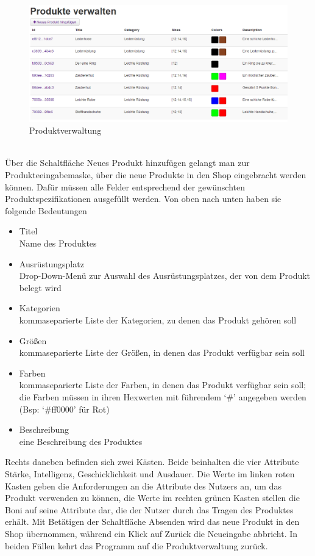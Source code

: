 \begin{figure}[h!]
  \centering
  \includegraphics[width=\textwidth]{img/Produkte.png}
  \caption{Produktverwaltung}
  \label{fig:Produktverwaltung}
\end{figure}
\text{}\vspace*{-1em}\\
Über die Schaltfläche Neues Produkt hinzufügen gelangt man zur Produkteeingabemaske, über die neue Produkte in den Shop eingebracht werden können. Dafür müssen alle Felder entsprechend der gewünschten Produktspezifikationen ausgefüllt werden. Von oben nach unten haben sie folgende Bedeutungen
\begin{itemize}
  \item Titel \\
        Name des Produktes
  \vspace*{-0.5em}
  \item Ausrüstungsplatz \\
        Drop-Down-Menü zur Auswahl  des Ausrüstungsplatzes, der von dem Produkt belegt wird
  \vspace*{-0.5em}
  \item Kategorien \\
        kommaseparierte Liste der Kategorien, zu denen das Produkt gehören soll
  \vspace*{-0.5em}
  \item Größen \\
        kommaseparierte Liste der Größen, in denen das Produkt verfügbar sein soll
  \vspace*{-0.5em}
  \item Farben \\
        kommaseparierte Liste der Farben, in denen das Produkt verfügbar sein soll; die Farben müssen in ihren Hexwerten mit führendem ‘\#’ angegeben werden (Bsp: ‘\#ff0000’ für Rot)
  \vspace*{-0.5em}
  \item Beschreibung \\
        eine Beschreibung des Produktes
\end{itemize}
Rechts daneben befinden sich zwei Kästen. Beide beinhalten die vier Attribute Stärke, Intelligenz, Geschicklichkeit und Ausdauer. Die Werte im linken roten Kasten geben die Anforderungen an die Attribute des Nutzers an, um das Produkt verwenden zu können, die Werte im rechten grünen Kasten stellen die Boni auf seine Attribute dar, die der Nutzer durch das Tragen des Produktes erhält.
Mit Betätigen der Schaltfläche Absenden wird das neue Produkt in den Shop übernommen, während ein Klick auf Zurück die Neueingabe abbricht. In beiden Fällen kehrt das Programm auf die Produktverwaltung zurück.


